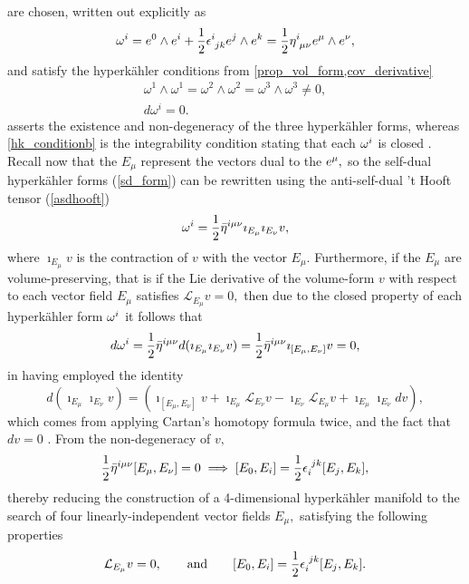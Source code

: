 \documentclass[a4paper,12pt, onecolumn, notitlepage]{article}
\theoremstyle{definition}
\theoremstyle{remark}
\newcommand{\w}{\omega}
\newcommand{\m}{\mu}
\newcommand{\n}{\nu}
\newcommand{\e}{\epsilon}
\newcommand{\HK}{hyperk\"ahler }
\newcommand{\hooft}[3]{\eta\indices{^{#1}_{#2}_{#3}}}
\begin{document}
are chosen, written out explicitly as
\begin{equation}
	\label{sd_form}
	\w^{i} = e^{0}\wedge e^{i} + \frac{1}{2}\e\indices{^i_j_k}e^{j}\wedge e^{k} = \frac{1}{2}\hooft{i}{\m}{\n}e^{\m}\wedge e^{\n},
\end{equation}
and satisfy the \HK conditions from  \cref{prop_vol_form,cov_derivative} 
\begin{subequations}
	\begin{gather}
	\label{hk_conditiona}
	\w^{1}\wedge\w^{1} = \w^{2}\wedge\w^{2} =\w^{3}\wedge\w^{3} \neq 0,\\
	\label{hk_conditionb}
	d\w^{i} = 0. 
	\end{gather}
\end{subequations}
 asserts the existence and non-degeneracy of the three \HK forms, whereas \cref{hk_conditionb} is the integrability condition stating that each $\w\indices{^i}$ is closed \cite{solitons}.\\
Recall now that the $E_{\m}$ represent the vectors dual to the $e\indices{^\m},$ so the self-dual \HK forms (\ref{sd_form}) can be rewritten using the anti-self-dual 't Hooft tensor (\ref{asdhooft}) \cite{ootsuka_1998}
\begin{equation*}
\w^{i} = \frac{1}{2}\bar{\eta}\indices{^i^\m^\n}\imath_{E_{\m}}\imath_{E_{\n}}v,
\end{equation*}
where $\imath_{E_{\m}}v$ is the contraction of $v$ with the vector $E_{\m}.$ Furthermore, if the $E_{\m}$ are volume-preserving, that is if the Lie derivative of the volume-form $v$ with respect to each vector field $E_{\m}$ satisfies $\mathcal{L}_{E_{\m}}v = 0,$ then due to the closed property of each \HK form $\w\indices{^i}$ it follows that
\begin{align*}
	d\w^{i} = \frac{1}{2}\bar{\eta}\indices{^i^\m^\n}d(\imath_{E_{\m}}\imath_{E_{\n}}v) = \frac{1}{2}\bar{\eta}\indices{^i^\m^\n}\imath_{[E_{\m},E_{\n}]}v=0,
\end{align*}
in having employed the identity
\begin{equation*}
	\label{cartan}
	d(\imath_{E_{\m}}\imath_{E_{\n}}v)=(\imath_{[E_{\m},E_{\n}]}v + \imath_{E_{\m}}\mathcal{L}_{E_{\n}}v - \imath_{E_{\n}}\mathcal{L}_{E_{\m}}v + \imath_{E_{\m}}\imath_{E_{\n}}dv),
\end{equation*}
which comes from applying Cartan's homotopy formula twice, and the fact that $dv=0$ \cite{donaldson}. From the non-degeneracy of $v,$
\begin{equation}
	\label{half_flat}
	\frac{1}{2}\bar{\eta}\indices{^i^\m^\n}[E_{\m},E_{\n}] = 0 \implies [E_{0},E_{i}]=\frac{1}{2}\e\indices{_i^j^k}[E_{j},E_{k}],
\end{equation}
thereby reducing the construction of a 4-dimensional \HK manifold to the search of four linearly-independent vector fields $E_{\m},$ satisfying the following properties \cite{ootsuka_1998}
\begin{gather*}
	\mathcal{L}_{E_{\m}}v = 0,\qquad \text{and}\qquad [E_{0},E_{i}]=\frac{1}{2}\e\indices{_i^j^k}[E_{j},E_{k}].
\end{gather*}
\end{document}
